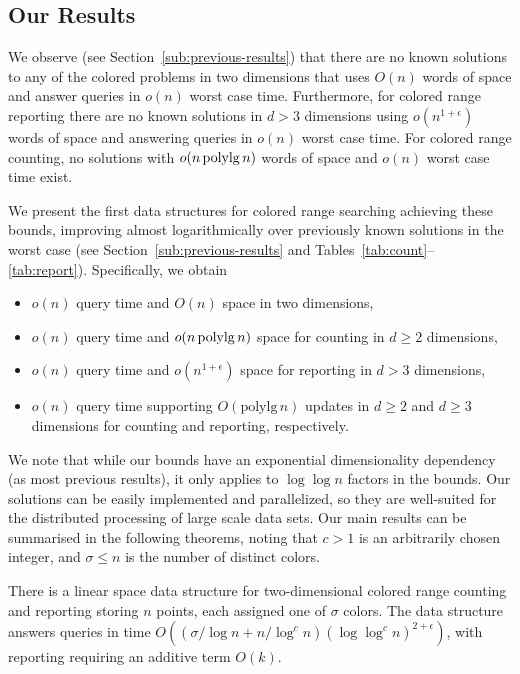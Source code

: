 \subsection{Our Results}
\label{sub:our-results}
%
We observe (see Section~\ref{sub:previous-results}) that there are no known solutions to any of the colored problems in two dimensions that uses $O(n)$ words of space and answer queries in $o(n)$ worst case time. Furthermore, for colored range reporting there are no known solutions in $d> 3$ dimensions using $o(n^{1+\epsilon})$ words of space and answering queries in $o(n)$ worst case time. For colored range counting, no solutions with $o(n \mathrm{\, polylg \,} n)$ words of space and $o(n)$ worst case time exist. 

We present the first data structures for colored range searching achieving these bounds, improving almost logarithmically over previously known solutions in the worst case (see Section~\ref{sub:previous-results} and Tables~\ref{tab:count}--\ref{tab:report}). Specifically, we obtain
\begin{itemize}
    \item $o(n)$ query time and $O(n)$ space in two dimensions,
    \item $o(n)$ query time and $o(n \mathrm{\, polylg \,} n)$ space for counting in $d \geq 2$ dimensions,
    \item $o(n)$ query time and $o(n^{1+\epsilon})$ space for reporting in $d > 3$ dimensions,
    \item $o(n)$ query time supporting $O(\mathrm{polylg \,} n)$ updates in $d \geq 2$ and $d \geq 3$ dimensions for counting and reporting, respectively.
\end{itemize}


We note that while our bounds have an exponential dimensionality dependency (as most previous results), it only applies to $\log \log n$ factors in the bounds.
Our solutions can be easily implemented and parallelized, so they are well-suited for the distributed processing of large scale data sets. Our main results can be summarised in the following theorems, noting that $c > 1$ is an arbitrarily chosen integer, and $\sigma \leq n$ is the number of distinct colors.

\begin{theorem}\label{thm:2D}
    There is a linear space data structure for two-dimensional colored range counting and reporting storing $n$ points, each assigned one of $\sigma$ colors. The data structure answers queries in time $O( ( \sigma / \log n + n / \log ^c n ) (\log \log ^c n)^{2+\epsilon} )$, with reporting requiring an additive term $O(k)$.
\end{theorem}

